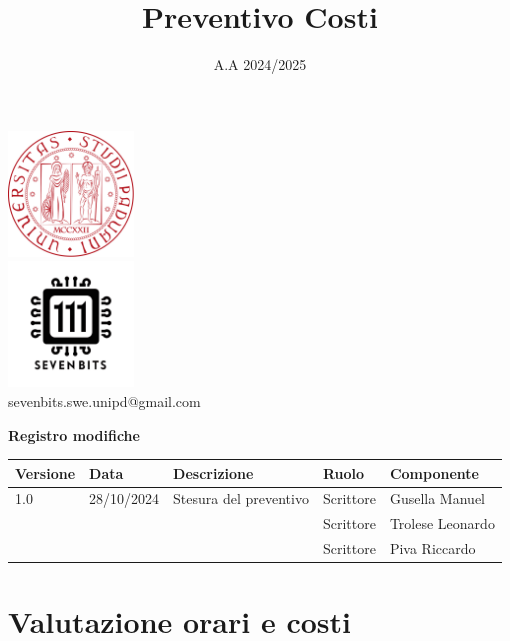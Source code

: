 \documentclass[10pt]{article}
\title{Preventivo Costi}
\date{A.A 2024/2025}
\begin{document}
\maketitle
\begin{center}
\includegraphics[width=0.25\textwidth]{LogoUnipd}\\
\includegraphics[width=0.25\textwidth]{Sevenbitslogo}\\
sevenbits.swe.unipd@gmail.com\\
\vspace{2mm}

\textbf{Registro modifiche}\\
\vspace{2mm}
\begin{tabular}{|l|l|l|l|l|}
\hline
\textbf{Versione} & \textbf{Data} & \textbf{Descrizione} & \textbf{Ruolo} & \textbf{Componente} \\
\hline
1.0 & 28/10/2024 & Stesura del preventivo & Scrittore & Gusella Manuel\\
& & & Scrittore & Trolese Leonardo\\
& & & Scrittore & Piva Riccardo\\
\hline
\end{tabular}
\end{center}
\newpage
\tableofcontents
\newpage
\section{Valutazione orari e costi}
\end{document}
